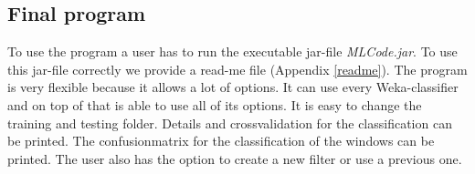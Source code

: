 \subsection{Final program}
To use the program a user has to run the executable jar-file \textit{MLCode.jar}. To use this jar-file correctly we provide a read-me file (Appendix \ref{readme}).
The program is very flexible because it allows a lot of options.
It can use every Weka-classifier and on top of that is able to use all of its options. It is easy to change the training and testing folder. Details and crossvalidation for the classification can be printed. The confusionmatrix for the classification of the windows can be printed. The user also has the option to create a new filter or use a previous one.


